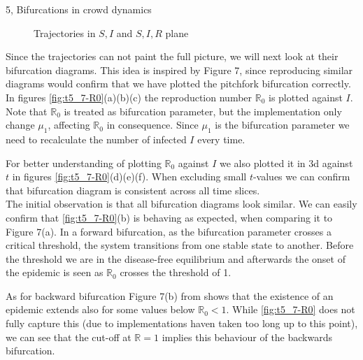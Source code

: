 \begin{task}{5, Bifurcations in crowd dynamics}
\begin{figure}[H]
\caption{Trajectories in $S,I$ and $S,I,R$ plane}
\label{fig:t5_7-traj}
\end{figure}

Since the trajectories can not paint the full picture, we will next look at their bifurcation diagrams. This idea is inspired by \cite{shan2014bifurcations} Figure 7, since reproducing similar diagrams would confirm that we have plotted the pitchfork bifurcation correctly. In figures \ref{fig:t5_7-R0}(a)(b)(c) the reproduction number $\mathbb{R}_0$ is plotted against $I$. Note that $\mathbb{R}_0$ is treated as bifurcation parameter, but the implementation only change $\mu_1$, affecting $\mathbb{R}_0$ in consequence. Since $\mu_1$ is the bifurcation parameter we need to recalculate the number of infected $I$ every time.

For better understanding of plotting $\mathbb{R}_0$ against $I$ we also plotted it in 3d against $t$ in figures \ref{fig:t5_7-R0}(d)(e)(f). When excluding small $t$-values we can confirm that bifurcation diagram is consistent across all time slices.\\

The initial observation is that all bifurcation diagrams look similar. We can easily confirm that \ref{fig:t5_7-R0}(b) is behaving as expected, when comparing it to \cite{shan2014bifurcations} Figure 7(a). In a forward bifurcation, as the bifurcation parameter crosses a critical threshold, the system transitions from one stable state to another. Before the threshold we are in the disease-free equilibrium and afterwards the onset of the epidemic is seen as $\mathbb{R}_0$ crosses the threshold of 1.

As for backward bifurcation Figure 7(b) from \cite{shan2014bifurcations} shows that the existence of an epidemic extends also for some values below $\mathbb{R}_0<1$. While \ref{fig:t5_7-R0} does not fully capture this (due to implementations haven taken too long up to this point), we can see that the cut-off at $\mathbb{R}=1$ implies this behaviour of the backwards bifurcation.


\end{task}
